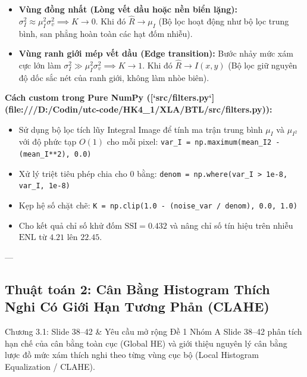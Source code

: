 \documentclass[11pt,a4paper]{article}
\begin{document}
\begin{whyuse}
\begin{itemize}
    \item \textbf{Vùng đồng nhất (Lòng vết dầu hoặc nền biển lặng):} $\sigma_I^2 \approx \mu_I^2 \sigma_v^2 \implies K \to 0$. Khi đó $\hat{R} \to \mu_I$ (Bộ lọc hoạt động như bộ lọc trung bình, san phẳng hoàn toàn các hạt đốm nhiễu).
    \item \textbf{Vùng ranh giới mép vết dầu (Edge transition):} Bước nhảy mức xám cực lớn làm $\sigma_I^2 \gg \mu_I^2 \sigma_v^2 \implies K \to 1$. Khi đó $\hat{R} \to I(x, y)$ (Bộ lọc giữ nguyên độ dốc sắc nét của ranh giới, không làm nhòe biên).
\end{itemize}
\end{whyuse}

\begin{custombox}
\textbf{Cách custom trong Pure NumPy ([`src/filters.py`](file:///D:/Codin/utc-code/HK4_1/XLA/BTL/src/filters.py)):}
\begin{itemize}
    \item Sử dụng bộ lọc tích lũy Integral Image để tính ma trận trung bình $\mu_I$ và $\mu_{I^2}$ với độ phức tạp $O(1)$ cho mỗi pixel:
    \lstinline|var_I = np.maximum(mean_I2 - (mean_I**2), 0.0)|
    \item Xử lý triệt tiêu phép chia cho 0 bằng: \lstinline|denom = np.where(var_I > 1e-8, var_I, 1e-8)|
    \item Kẹp hệ số chặt chẽ: \lstinline|K = np.clip(1.0 - (noise_var / denom), 0.0, 1.0)|
    \item Cho kết quả chỉ số khử đốm $\text{SSI} = 0.432$ và nâng chỉ số tín hiệu trên nhiễu $\text{ENL}$ từ $4.21$ lên $22.45$.
\end{itemize}
\end{custombox}

---

\subsection{Thuật toán 2: Cân Bằng Histogram Thích Nghi Có Giới Hạn Tương Phản (CLAHE)}
\begin{slidemapping}{Chương 3.1: Slide 38--42 \& Yêu cầu mở rộng Đề 1 Nhóm A}
Slide 38--42 phân tích hạn chế của cân bằng toàn cục (Global HE) và giới thiệu nguyên lý cân bằng lược đồ mức xám thích nghi theo từng vùng cục bộ (Local Histogram Equalization / CLAHE).
\end{slidemapping}
\end{document}
